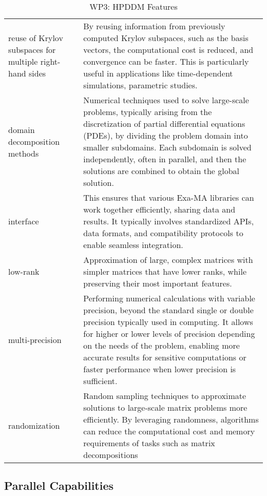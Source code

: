 \begin{table}[h!]
{{\begin{tabular}{!{\color{numpexgray}\vrule}p{.25\linewidth}!{\color{numpexgray}\vrule}p{.6885\linewidth}!{\color{numpexgray}\vrule}}
    reuse of Krylov subspaces for multiple right-hand sides & By reusing information from previously computed Krylov subspaces, such as the basis vectors, the computational cost is reduced, and convergence can be faster. This is particularly useful in applications like time-dependent simulations, parametric studies. \\
    domain decomposition methods & Numerical techniques used to solve large-scale problems, typically arising from the discretization of partial differential equations (PDEs), by dividing the problem domain into smaller subdomains. Each subdomain is solved independently, often in parallel, and then the solutions are combined to obtain the global solution.\\
    interface & This ensures that various Exa-MA libraries can work together efficiently, sharing data and results. It typically involves standardized APIs, data formats, and compatibility protocols to enable seamless integration.\\
    low-rank & Approximation of large, complex matrices with simpler matrices that have lower ranks, while preserving their most important features. \\
    multi-precision & Performing numerical calculations with variable precision, beyond the standard single or double precision typically used in computing. It allows for higher or lower levels of precision depending on the needs of the problem, enabling more accurate results for sensitive computations or faster performance when lower precision is sufficient. \\
    randomization & Random sampling techniques to approximate solutions to large-scale matrix problems more efficiently. By leveraging randomness, algorithms can reduce the computational cost and memory requirements of tasks such as matrix decompositions \\
\end{tabular}
        }
    }
    \caption{WP3: HPDDM Features}
    \label{tab:WP3:HPDDM:features}
\end{table}


\subsection{Parallel Capabilities}
\label{sec:WP3:HPDDM:performances}


